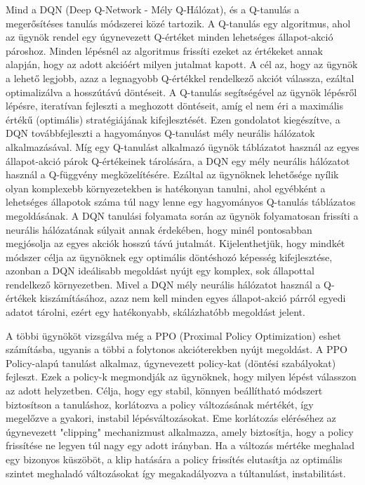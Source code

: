 \documentclass[
]{thesis-ekf}
\theoremstyle{definition}
\theoremstyle{remark}
\begin{document}
	Mind a DQN (Deep Q-Network - Mély Q-Hálózat), és a Q-tanulás a megerősítéses tanulás módszerei közé tartozik. A Q-tanulás egy algoritmus, ahol az ügynök rendel egy úgynevezett Q-értéket minden lehetséges állapot-akció pároshoz. Minden lépésnél az algoritmus frissíti ezeket az értékeket annak alapján, hogy az adott akcióért milyen jutalmat kapott. A cél az, hogy az ügynök a lehető legjobb, azaz a legnagyobb Q-értékkel rendelkező akciót válassza, ezáltal optimalizálva a hosszútávú döntéseit. A Q-tanulás segítségével az ügynök lépésről lépésre, iteratívan fejleszti a meghozott döntéseit, amíg el nem éri a maximális értékű (optimális) stratégiájának kifejlesztését. Ezen gondolatot kiegészítve, a DQN továbbfejleszti a hagyományos Q-tanulást mély neurális hálózatok alkalmazásával. Míg egy Q-tanulást alkalmazó ügynök táblázatot használ az egyes állapot-akció párok Q-értékeinek tárolására, a DQN egy mély neurális hálózatot használ a Q-függvény megközelítésére. Ezáltal az ügynöknek lehetősége nyílik olyan komplexebb környezetekben is hatékonyan tanulni, ahol egyébként a lehetséges állapotok száma túl nagy lenne egy hagyományos Q-tanulás táblázatos megoldásának. A DQN tanulási folyamata során az ügynök folyamatosan frissíti a neurális hálózatának súlyait annak érdekében, hogy minél pontosabban megjósolja az egyes akciók hosszú távú jutalmát. Kijelenthetjük, hogy mindkét módszer célja az ügynöknek egy optimális döntéshozó képesség kifejlesztése, azonban a DQN ideálisabb megoldást nyújt egy komplex, sok állapottal rendelkező környezetben. Mivel a DQN mély neurális hálózatot használ a Q-értékek kiszámításához, azaz nem kell minden egyes állapot-akció párról egyedi adatot tárolni, ezért egy hatékonyabb, skálázhatóbb megoldást jelent.
	
	A többi ügynököt vizsgálva még a PPO (Proximal Policy Optimization) eshet számításba, ugyanis a többi a folytonos akcióterekben nyújt megoldást. A PPO Policy-alapú tanulást alkalmaz, úgynevezett policy-kat (döntési szabályokat) fejleszt. Ezek a policy-k megmondják az ügynöknek, hogy milyen lépést válasszon az adott helyzetben. Célja, hogy egy stabil, könnyen beállítható módszert biztosítson a tanuláshoz, korlátozva a policy változásának mértékét, így megelőzve a gyakori, instabil lépésváltozásokat. Eme korlátozás eléréséhez az úgynevezett "clipping" mechanizmust alkalmazza, amely biztosítja, hogy a policy frissítése ne legyen túl nagy egy adott irányban. Ha a változás mértéke meghalad egy bizonyos küszöböt, a klip hatására a policy frissítés elutasítja az optimális szintet meghaladó változásokat így megakadályozva a túltanulást, instabilitást. \cite{PPO}
	
\end{document}
